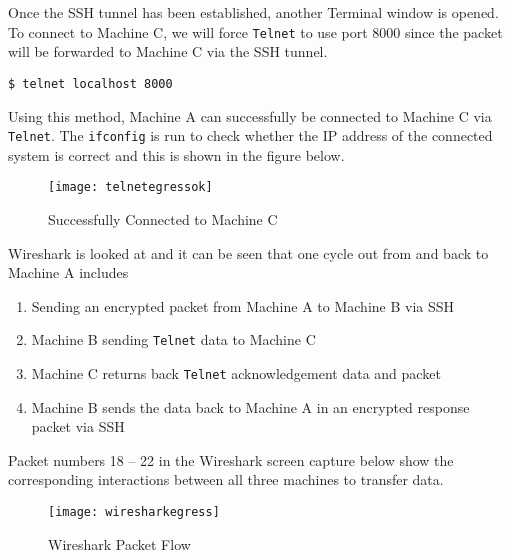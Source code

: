 \documentclass[a4paper,12pt]{article}
\begin{document}
\noindent Once the SSH tunnel has been established, another Terminal window is opened. To connect to Machine C, we will force \texttt{Telnet} to use port 8000 since the packet will be forwarded to Machine C via the SSH tunnel.
\begin{verbatim}
$ telnet localhost 8000
\end{verbatim}
Using this method, Machine A can successfully be connected to Machine C via \texttt{Telnet}. The \texttt{ifconfig} is run to check whether the IP address of the connected system is correct and this is shown in the figure below.

\begin{figure}[H]
\centering
\texttt{[image: telnetegressok]}
\caption{Successfully Connected to Machine C}
\label{fig:telnetegressok}
\end{figure}
\noindent Wireshark is looked at and it can be seen that one cycle out from and back to Machine A includes
\begin{enumerate}
\itemsep0em
\item Sending an encrypted packet from Machine A to Machine B via SSH
\item Machine B sending \texttt{Telnet} data to Machine C
\item Machine C returns back \texttt{Telnet} acknowledgement data and packet
\item Machine B sends the data back to Machine A in an encrypted response packet via SSH
\end{enumerate}
Packet numbers 18 -- 22 in the Wireshark screen capture below show the corresponding interactions between all three machines to transfer data.
\begin{figure}[H]
\centering
\texttt{[image: wiresharkegress]}
\caption{Wireshark Packet Flow}
\label{fig:wiresharkegress}
\end{figure}
\end{document}
